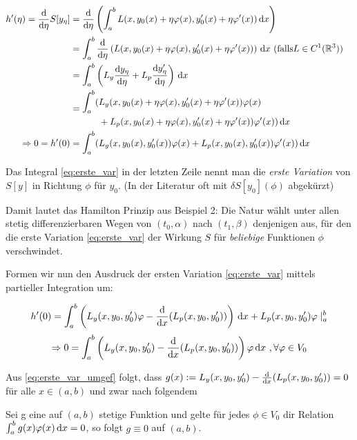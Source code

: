 \begin{align}
    h'(\eta) = \frac{\mathrm{d} }{\mathrm{d} \eta} S[y_\eta] &= \frac{\mathrm{d} }{\mathrm{d} \eta} \left(
        \int_{a}^{b} L(x, y_0(x) + \eta \varphi(x), y_0'(x) + \eta \varphi'(x)) \, \mathrm{d}x\right) \notag \\
    &= \int_{a}^{b}  \frac{\mathrm{d} }{\mathrm{d} \eta}\left(L(x, y_0(x) + \eta \varphi(x), y_0'(x) + \eta \varphi'(x))\right) \, \mathrm{d}x
        \,\,(\mathrm{falls} L\in C^1(\mathbb{R}^3)) \notag \\
    &= \int_{a}^{b} \left( L_y \frac{\mathrm{d} y_\eta}{\mathrm{d} \eta} + L_p \frac{\mathrm{d} y_\eta'}{\mathrm{d} \eta}\right) \, \mathrm{d}x \notag \\
    &= \begin{aligned}
            \int_{a}^{b} ( & L_y(x, y_0(x) + \eta \varphi(x), y_0'(x) + \eta \varphi'(x)) \varphi(x) \\
            & + L_p(x, y_0(x) + \eta \varphi(x), y_0'(x) + \eta \varphi'(x)) \varphi'(x)) \, \mathrm{d}x
        \end{aligned} \notag \\
    \Rightarrow 0 = h'(0) &= \int_{a}^{b} ( L_y(x, y_0(x), y_0'(x)) \varphi(x) + L_p(x, y_0(x), y_0'(x)) \varphi'(x) ) \, \mathrm{d}x & \label{eq:erste_var}
\end{align}

Das Integral \eqref{eq:erste_var} in der letzten Zeile nennt man die \textit{erste Variation} von $S[y]$ in Richtung $\phi$ für $y_0$.
(In der Literatur oft mit $\delta S[y_0](\phi)$ abgekürzt)

Damit lautet das Hamilton Prinzip aus Beispiel 2: Die Natur wählt unter allen stetig differenzierbaren Wegen von
$(t_0, \alpha)$ nach $(t_1, \beta)$ denjenigen aus, für den die erste Variation \eqref{eq:erste_var} der Wirkung
$S$ für \textit{beliebige} Funktionen $\phi$ verschwindet.

Formen wir nun den Ausdruck der ersten Variation \eqref{eq:erste_var} mittels partieller Integration um:

\[ h'(0) = \int_{a}^{b} \left( L_y(x, y_0, y_0')\varphi - \frac{\mathrm{d} }{\mathrm{d} x}(L_p(x, y_0, y_0')) \right) \, \mathrm{d}x + L_p(x, y_0, y_0')\varphi \mid_a^b \]
\begin{equation}
    \Rightarrow 0 = \int_{a}^{b} \left( L_y(x, y_0, y_0') - \frac{\mathrm{d} }{\mathrm{d} x}(L_p(x, y_0, y_0'))\right) \varphi \, \mathrm{d}x \,\, , \forall\varphi\in V_0
    \label{eq:erste_var_umgef}
\end{equation}

Aus \eqref{eq:erste_var_umgef} folgt, dass $g(x) := L_y(x, y_0, y_0') - \frac{\mathrm{d} }{\mathrm{d} x}(L_p(x, y_0, y_0')) = 0$ für alle $x\in(a, b)$ und
zwar nach folgendem

\begin{lem}
    Sei g eine auf $(a, b)$ stetige Funktion und gelte für jedes $\phi\in V_0$ dir Relation
    $\int_{a}^{b} g(x) \varphi(x) \, \mathrm{d}x = 0$, so folgt $g \equiv 0$ auf $(a, b)$.
\end{lem}

